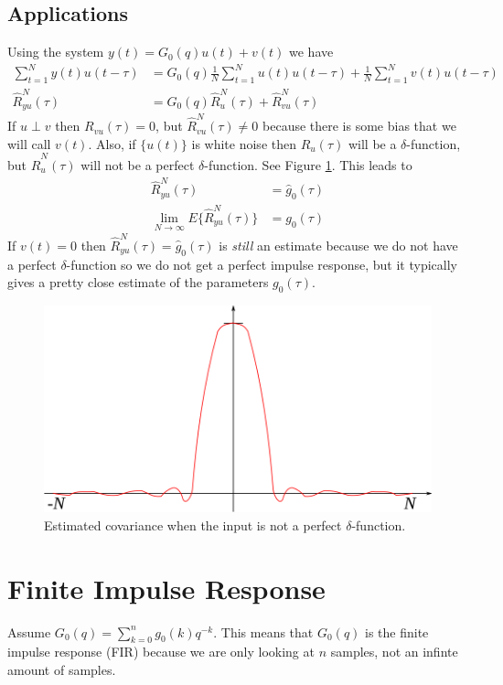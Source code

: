 \documentclass[lecture,12pt,]{pcms-l}
\theoremstyle{example}
\newcommand{\ruhat}{\hat{R}_u^N(\tau)}
\newcommand{\ryuhat}{\hat{R}_{yu}^N(\tau)}
\begin{document}
\subsection{Applications}
Using the system $y(t) = G_0(q)u(t)+v(t)$ we have
\begin{align*}
\sum_{t=1}^Ny(t)u(t-\tau) &= G_0(q)\frac{1}{N}\sum_{t=1}^Nu(t)u(t-\tau) + \frac{1}{N}\sum_{t=1}^Nv(t)u(t-\tau) \\
\ryuhat &= G_0(q)\ruhat + \hat{R}_{vu}^N(\tau)
\end{align*}
If $u\perp v$ then $R_{vu}(\tau)=0$, but $\hat{R}_{vu}^N(\tau)\neq 0$ because there is some bias that we will call $v(t)$. Also, if $\{u(t)\}$ is white noise then $R_u(\tau)$ will be a $\delta$-function, but $\ruhat$ will not be a perfect $\delta$-function. See Figure \ref{fig:05xcov}. This leads to
\begin{align*}
\ryuhat &= \hat{g}_0(\tau) \\
\lim_{N\to\infty}E\{\ryuhat\} &= g_0(\tau)
\end{align*}
If $v(t)=0$ then $\ryuhat=\hat{g}_0(\tau)$ is \textit{still} an estimate because we do not have a perfect $\delta$-function so we do not get a perfect impulse response, but it typically gives a pretty close estimate of the parameters $g_0(\tau)$.
\begin{figure}[ht!]
	\centering
	\includegraphics[width=.6\textwidth]{images/05xcov}
	\caption{Estimated covariance when the input is not a perfect $\delta$-function.}
	\label{fig:05xcov}
\end{figure}

\section{Finite Impulse Response}
Assume $G_0(q) = \sum_{k=0}^ng_0(k)q^{-k}$. This means that $G_0(q)$ is the finite impulse response (FIR) because we are only looking at $n$ samples, not an infinte amount of samples.
\end{document}
